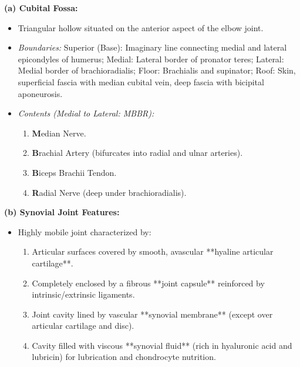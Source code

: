 \documentclass[11pt,a4paper]{article}
\begin{document}
\begin{ansbox}
\textbf{(a) Cubital Fossa:}
\begin{itemize}[leftmargin=*]
    \item Triangular hollow situated on the anterior aspect of the elbow joint.
    \item \textit{Boundaries:} Superior (Base): Imaginary line connecting medial and lateral epicondyles of humerus; Medial: Lateral border of pronator teres; Lateral: Medial border of brachioradialis; Floor: Brachialis and supinator; Roof: Skin, superficial fascia with median cubital vein, deep fascia with bicipital aponeurosis.
    \item \textit{Contents (Medial to Lateral: MBBR):}
    \begin{enumerate}
        \item \textbf{M}edian Nerve.
        \item \textbf{B}rachial Artery (bifurcates into radial and ulnar arteries).
        \item \textbf{B}iceps Brachii Tendon.
        \item \textbf{R}adial Nerve (deep under brachioradialis).
    \end{enumerate}
\end{itemize}

\textbf{(b) Synovial Joint Features:}
\begin{itemize}[leftmargin=*]
    \item Highly mobile joint characterized by:
    \begin{enumerate}
        \item Articular surfaces covered by smooth, avascular **hyaline articular cartilage**.
        \item Completely enclosed by a fibrous **joint capsule** reinforced by intrinsic/extrinsic ligaments.
        \item Joint cavity lined by vascular **synovial membrane** (except over articular cartilage and disc).
        \item Cavity filled with viscous **synovial fluid** (rich in hyaluronic acid and lubricin) for lubrication and chondrocyte nutrition.
    \end{enumerate}
\end{itemize}


\end{ansbox}
\end{document}
